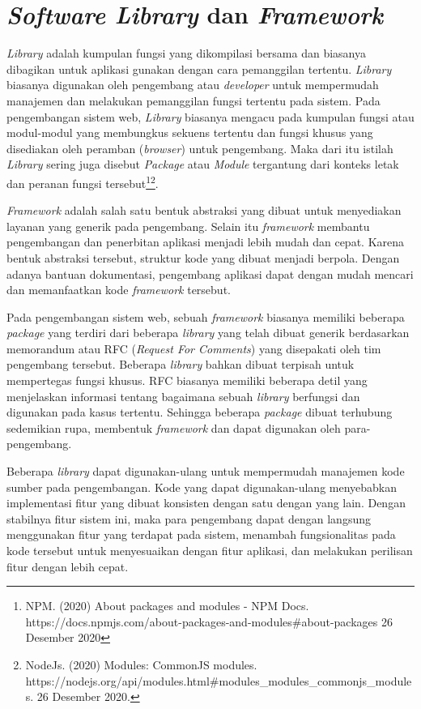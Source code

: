\section{\textit{Software Library} dan \textit{Framework}}
    \textit{Library} adalah kumpulan fungsi yang dikompilasi bersama dan
    biasanya dibagikan untuk aplikasi gunakan dengan cara pemanggilan tertentu.
    \textit{Library} biasanya digunakan oleh pengembang atau \emph{developer}
    untuk mempermudah manajemen dan melakukan pemanggilan fungsi tertentu pada
    sistem. Pada pengembangan sistem web, \textit{Library} biasanya mengacu pada
    kumpulan fungsi atau modul-modul yang membungkus sekuens tertentu dan fungsi
    khusus yang disediakan oleh peramban (\textit{browser}) untuk pengembang.
    Maka dari itu istilah \textit{Library} sering juga disebut \textit{Package}
    atau \textit{Module} tergantung dari konteks letak dan peranan fungsi
    tersebut\footnote{NPM. (2020) About packages and modules - NPM Docs.
    https://docs.npmjs.com/about-packages-and-modules\#about-packages
    26 Desember 2020}\footnote{NodeJs. (2020) Modules: CommonJS modules.
    https://nodejs.org/api/modules.html\#modules\_modules\_commonjs\_modules. 26 Desember 2020.}.
    
    \textit{Framework} adalah salah satu bentuk abstraksi yang dibuat untuk
    menyediakan layanan yang generik pada pengembang. Selain itu
    \textit{framework} membantu pengembangan dan penerbitan aplikasi menjadi
    lebih mudah dan cepat. Karena bentuk abstraksi tersebut, struktur kode yang
    dibuat menjadi berpola. Dengan adanya bantuan dokumentasi, pengembang
    aplikasi dapat dengan mudah mencari dan memanfaatkan kode \textit{framework}
    tersebut.
    
    Pada pengembangan sistem web, sebuah \textit{framework} biasanya memiliki
    beberapa \textit{package} yang terdiri dari beberapa \textit{library}
    yang telah dibuat generik berdasarkan memorandum atau RFC 
    (\textit{Request For Comments}) yang disepakati oleh tim pengembang
    tersebut\cite{reactjs:rfc}. Beberapa \textit{library} bahkan dibuat terpisah
    untuk mempertegas fungsi khusus. RFC biasanya memiliki beberapa detil yang menjelaskan
    informasi tentang bagaimana sebuah \textit{library} berfungsi dan digunakan
    pada kasus tertentu. Sehingga
    beberapa \textit{package} dibuat terhubung sedemikian rupa, membentuk
    \textit{framework} dan dapat digunakan oleh para-pengembang. 
    
    Beberapa \textit{library} dapat digunakan-ulang untuk mempermudah manajemen 
    kode sumber pada pengembangan.
    Kode yang dapat digunakan-ulang menyebabkan implementasi fitur yang dibuat
    konsisten dengan satu dengan yang lain. Dengan stabilnya fitur sistem ini,
    maka para pengembang dapat dengan langsung menggunakan fitur yang terdapat
    pada sistem, menambah fungsionalitas pada kode tersebut untuk menyesuaikan dengan
    fitur aplikasi, dan melakukan perilisan fitur dengan lebih cepat.

